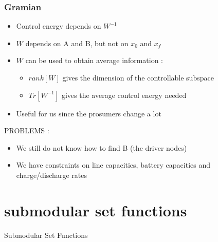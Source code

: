 \documentclass[xcolor=dvipsnames]{beamer}
\begin{document}
\begin{frame}
	\frametitle{Gramian}
	
	\begin{itemize}
		\item Control energy depends on $W^{-1}$
		\item $W$ depends on A and B, but not on $x_0$ and $x_f$
		\item $W$ can be used to obtain average information :
		\begin{itemize}
			\item $rank[W] $ gives the dimension of the controllable subspace
			\item $Tr[W^{-1}]$ gives the average control energy needed
		\end{itemize}
		\item Useful for us since the prosumers change a lot
	\end{itemize}
	PROBLEMS :
	\begin{itemize}
		\item We still do not know how to find B (the driver nodes)
		\item We have constraints on line capacities, battery capacities and charge/discharge rates
	\end{itemize}
\end{frame}

\section{submodular set functions}
\begin{frame}
	\begin{huge}
		\begin{center}
			Submodular Set Functions
		\end{center}
	\end{huge}
\end{frame}
\end{document}
